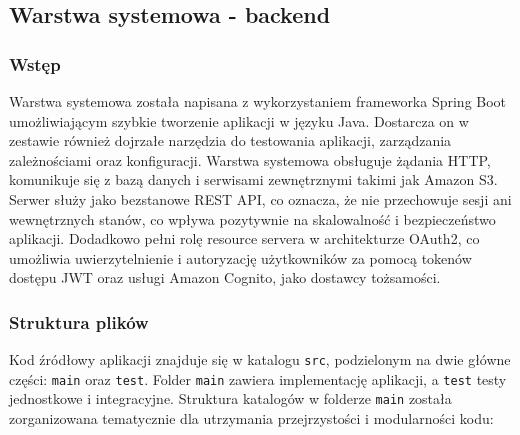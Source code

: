\documentclass[../../main.tex]{subfiles}
\begin{document}
    \subsection{Warstwa systemowa - backend}

    \subsubsection{Wstęp}
    Warstwa systemowa została napisana z wykorzystaniem frameworka Spring Boot\cite{springboot} umożliwiającym szybkie tworzenie aplikacji w języku Java.
    Dostarcza on w zestawie również dojrzałe narzędzia do testowania aplikacji, zarządzania zależnościami oraz konfiguracji.
    Warstwa systemowa obsługuje żądania HTTP, komunikuje się z bazą danych i serwisami zewnętrznymi takimi jak Amazon S3.
    Serwer służy jako bezstanowe REST API, co oznacza, że nie przechowuje sesji ani wewnętrznych stanów, co wpływa pozytywnie na skalowalność i bezpieczeństwo aplikacji.
    Dodadkowo pełni rolę resource servera w architekturze OAuth2, co umożliwia uwierzytelnienie i autoryzację użytkowników za pomocą tokenów dostępu JWT oraz usługi Amazon Cognito, jako dostawcy tożsamości.

    \subsubsection{Struktura plików}
    Kod źródłowy aplikacji znajduje się w katalogu \texttt{src}, podzielonym na dwie główne części: \texttt{main} oraz \texttt{test}.
    Folder \texttt{main} zawiera implementację aplikacji, a \texttt{test} testy jednostkowe i integracyjne.
    Struktura katalogów w folderze \texttt{main} została zorganizowana tematycznie dla utrzymania przejrzystości i modularności kodu:
\end{document}
